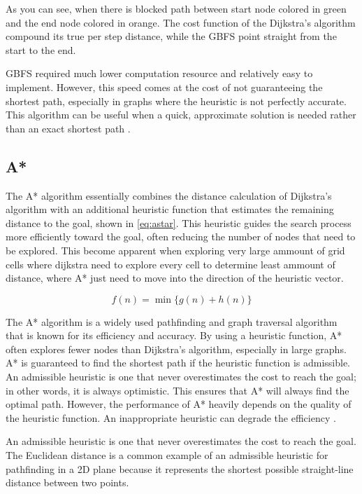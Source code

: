 \documentclass[12pt]{report}
\begin{document}
        As you can see, when there is blocked path between start node colored in green and the end node colored in orange.
        The cost function of the Dijkstra's algorithm compound its true per step distance, while the GBFS point straight
        from the start to the end. 
        
        GBFS required much lower computation resource and relatively easy to implement. However, this speed comes at the
        cost of not guaranteeing the shortest path, especially in graphs where the heuristic is not perfectly accurate.
        This algorithm can be useful when a quick, approximate solution is needed rather than an exact shortest path
        \cite{russell_artificial_2016}.

        \subsection{A*}
        The A* algorithm essentially combines the distance calculation of Dijkstra's algorithm with an additional
        heuristic function that estimates the remaining distance to the goal, shown in \ref{eq:astar}. This heuristic
        guides the search process more efficiently toward the goal, often reducing the number of nodes that need to be
        explored. This become apparent when exploring very large ammount of grid cells where dijkstra need to explore
        every cell to determine least ammount of distance, where A* just need to move into the direction of the
        heuristic vector.

        \begin{equation}\label{eq:astar}
            f(n) = \min_{} \{g(n) + h(n)\}
        \end{equation}

        The A* algorithm is a widely used pathfinding and graph traversal algorithm that is known for its efficiency and
        accuracy. By using a heuristic function, A* often explores fewer nodes than Dijkstra's algorithm, especially in
        large graphs. A* is guaranteed to find the shortest path if the heuristic function is admissible. An admissible
        heuristic is one that never overestimates the cost to reach the goal; in other words, it is always optimistic.
        This ensures that A* will always find the optimal path. However, the performance of A* heavily depends on the
        quality of the heuristic function. An inappropriate heuristic can degrade the efficiency \cite{knuth_art_1997}.

        An admissible heuristic is one that never overestimates the cost to reach the goal. The Euclidean distance is a
        common example of an admissible heuristic for pathfinding in a 2D plane because it represents the shortest
        possible straight-line distance between two points.
            
\end{document}
